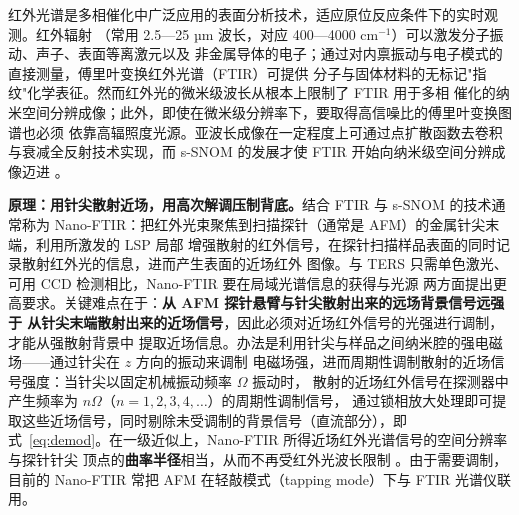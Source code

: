 红外光谱是多相催化中广泛应用的表面分析技术，适应原位反应条件下的实时观测。红外辐射
（常用 2.5—25 µm 波长，对应 400—4000 cm$^{-1}$）可以激发分子振动、声子、表面等离激元以及
非金属导体的电子；通过对内禀振动与电子模式的直接测量，傅里叶变换红外光谱（FTIR）可提供
分子与固体材料的无标记"指纹"化学表征。然而红外光的微米级波长从根本上限制了 FTIR 用于多相
催化的纳米空间分辨成像；此外，即使在微米级分辨率下，要取得高信噪比的傅里叶变换图谱也必须
依靠高辐照度光源。亚波长成像在一定程度上可通过点扩散函数去卷积与衰减全反射技术实现，而
s-SNOM 的发展才使 FTIR 开始向纳米级空间分辨成像迈进
。

\begin{principle}
\textbf{原理：用针尖散射近场，用高次解调压制背底。}结合 FTIR 与 s-SNOM 的技术通常称为
Nano-FTIR：把红外光束聚焦到扫描探针（通常是 AFM）的金属针尖末端，利用所激发的 LSP 局部
增强散射的红外信号，在探针扫描样品表面的同时记录散射红外光的信息，进而产生表面的近场红外
图像。与 TERS 只需单色激光、可用 CCD 检测相比，Nano-FTIR 要在局域光谱信息的获得与光源
两方面提出更高要求。关键难点在于：\textbf{从 AFM 探针悬臂与针尖散射出来的远场背景信号远强于
从针尖末端散射出来的近场信号}，因此必须对近场红外信号的光强进行调制，才能从强散射背景中
提取近场信息。办法是利用针尖与样品之间纳米腔的强电磁场——通过针尖在 $z$ 方向的振动来调制
电磁场强，进而周期性调制散射的近场信号强度：当针尖以固定机械振动频率 $\Omega$ 振动时，
散射的近场红外信号在探测器中产生频率为 $n\Omega$（$n=1,2,3,4,\dots$）的周期性调制信号，
通过锁相放大处理即可提取这些近场信号，同时剔除未受调制的背景信号（直流部分），即
式~\eqref{eq:demod}。在一级近似上，Nano-FTIR 所得近场红外光谱信号的空间分辨率与探针针尖
顶点的\textbf{曲率半径}相当，从而不再受红外光波长限制
。由于需要调制，目前的 Nano-FTIR 常把 AFM
在轻敲模式（tapping mode）下与 FTIR 光谱仪联用。
\end{principle}

